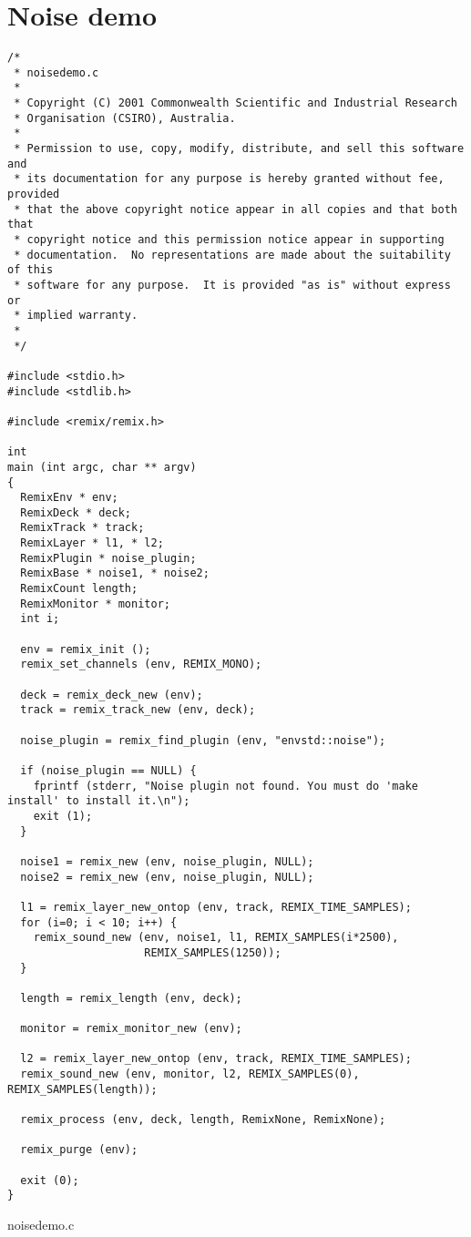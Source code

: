 \section{Noise demo}
\label{group__noisedemo}


\footnotesize\begin{verbatim}/*
 * noisedemo.c
 *
 * Copyright (C) 2001 Commonwealth Scientific and Industrial Research
 * Organisation (CSIRO), Australia.
 *
 * Permission to use, copy, modify, distribute, and sell this software and
 * its documentation for any purpose is hereby granted without fee, provided
 * that the above copyright notice appear in all copies and that both that
 * copyright notice and this permission notice appear in supporting
 * documentation.  No representations are made about the suitability of this
 * software for any purpose.  It is provided "as is" without express or
 * implied warranty.
 *
 */

#include <stdio.h>
#include <stdlib.h>

#include <remix/remix.h>

int
main (int argc, char ** argv)
{
  RemixEnv * env;
  RemixDeck * deck;
  RemixTrack * track;
  RemixLayer * l1, * l2;
  RemixPlugin * noise_plugin;
  RemixBase * noise1, * noise2;
  RemixCount length;
  RemixMonitor * monitor;
  int i;

  env = remix_init ();
  remix_set_channels (env, REMIX_MONO);

  deck = remix_deck_new (env);
  track = remix_track_new (env, deck);

  noise_plugin = remix_find_plugin (env, "envstd::noise");

  if (noise_plugin == NULL) {
    fprintf (stderr, "Noise plugin not found. You must do 'make install' to install it.\n");
    exit (1);
  }

  noise1 = remix_new (env, noise_plugin, NULL);
  noise2 = remix_new (env, noise_plugin, NULL);

  l1 = remix_layer_new_ontop (env, track, REMIX_TIME_SAMPLES);
  for (i=0; i < 10; i++) {
    remix_sound_new (env, noise1, l1, REMIX_SAMPLES(i*2500),
                     REMIX_SAMPLES(1250));
  }

  length = remix_length (env, deck);

  monitor = remix_monitor_new (env);

  l2 = remix_layer_new_ontop (env, track, REMIX_TIME_SAMPLES);
  remix_sound_new (env, monitor, l2, REMIX_SAMPLES(0), REMIX_SAMPLES(length));

  remix_process (env, deck, length, RemixNone, RemixNone);

  remix_purge (env);

  exit (0);
}
\end{verbatim}\normalsize
 noisedemo.c 

